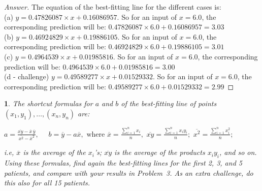 \documentclass [11pt, letterpaper] {amsart}
\theoremstyle{plain}
\newtheorem{exer}{}
\theoremstyle{definition}
\begin{document}
\begin{proof}[Answer]
The equation of the best-fitting line for the different cases is:\\
(a) $y=0.47826087\times x + 0.16086957$. So for an input of $x=6.0$, the corresponding prediction will be: $0.47826087\times 6.0 + 0.16086957 = 3.03$\\
(b) $y=0.46924829\times x + 0.19886105$. So for an input of $x=6.0$, the corresponding prediction will be: $0.46924829\times 6.0 + 0.19886105 = 3.01$\\
(c) $y=0.4964539\times x + 0.01985816$. So for an input of $x=6.0$, the corresponding prediction will be: $0.4964539\times 6.0 + 0.01985816 = 3.00$\\
(d - challenge) $y=0.49589277\times x + 0.01529332$. So for an input of $x=6.0$, the corresponding prediction will be: $0.49589277\times 6.0 + 0.01529332 = 2.99$
\end{proof}





\vspace{0.05in}
\begin{exer}
The shortcut formulas for $a$ and $b$ of the best-fitting line of points $(x_1,y_1),\ldots,(x_n,y_n)$ are:
\newline\centerline{$\displaystyle{a=\frac{\overline{xy}-\overline{x}\,\overline{y}}{\overline{x^2}-\overline{x}^2},\,\,\quad b=\overline{y}-a\overline{x}, \text{ where } \overline{x}=\frac{\sum_{i=1}^nx_i}{n}, \,\, \overline{xy}=\frac{\sum_{i=1}^nx_iy_i}{n}; \,\,\overline{x^2}=\frac{\sum_{i=1}^nx_i^2}{n};}$}
i.e, $\overline{x}$  is the average of the $x_i$'s; $\overline{xy}$ is the average of the products $x_iy_i$, and so on.
Using these formulas, find again the best-fitting lines for the first 2, 3, and 5 patients, and compare with your results in Problem~3. As an extra challenge, do this also for all 15 patients.


\end{exer}
\end{document}

